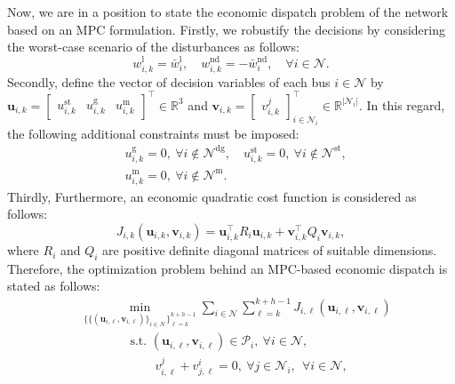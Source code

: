 Now, we are in a position to state the economic dispatch problem of the network based on an MPC formulation. Firstly, we robustify the decisions by considering the worst-case scenario of the disturbances as follows: 
\begin{equation}
w_{i,k}^{\mathrm{l}} = \bar{w}_{i}^{\mathrm{l}}, \quad 
w_{i,k}^{\mathrm{nd}} = -\bar{w}_{i}^{\mathrm{nd}}, \quad \forall i \in \mathcal{N}. \label{eq:ws_d}
\end{equation}
Secondly, define the vector of decision variables of each bus $i\in \mathcal{N}$ by $\bm{u}_{i,k} = \begin{bmatrix}
u^{\mathrm{st}}_{i,k} & u^{\mathrm{g}}_{i,k}  & u^{\mathrm{m}}_{i,k}
\end{bmatrix}^{\top} \in \mathbb{R}^{3}$ and $\bm{v}_{i,k} = \begin{bmatrix}
v_{i,k}^{j}
\end{bmatrix}_{i\in \mathcal{N}_i}^{\top} \in \mathbb{R}^{|\mathcal{N}_i|}$. In this regard, the following additional constraints must be imposed:
\begin{equation}
\begin{aligned}
&u_{i,k}^{\mathrm{g}}=0, \ \forall i \notin \mathcal{N}^{\mathrm{dg}}, \quad u_{i,k}^{\mathrm{st}}=0, \ \forall i \notin \mathcal{N}^{\mathrm{st}}, \\ &u_{i,k}^{\mathrm{m}}=0, \ \forall i \notin \mathcal{N}^{\mathrm{m}}. 
\end{aligned}
\label{eq:0_const}
\end{equation}
Thirdly, 
\fi 
Furthermore, an economic quadratic cost function is considered as follows:
\begin{equation}
J_{i,k}(\bm{u}_{i,k},\bm{v}_{i,k}) = \bm{u}_{i,k}^{\top}R_i\bm{u}_{i,k}+ \bm{v}_{i,k}^{\top}Q_i\bm{v}_{i,k}, \label{eq:cost_func}
\end{equation}
where $R_i$ and $Q_i$ are positive definite diagonal matrices of suitable dimensions. Therefore, the optimization problem behind an MPC-based economic dispatch is stated as follows:
\begin{subequations}
	\begin{align}
&	\min_{\{\{(\bm{u}_{i,\ell},\bm{v}_{i,\ell})\}_{i \in \mathcal{N}}\}_{\ell=k}^{k+h-1}} \sum_{i \in \mathcal{N}} \sum_{\ell =k}^{k+h-1}  J_{i,\ell}(\bm{u}_{i,\ell},\bm{v}_{i,\ell}) \label{eq:net_cost_func}\\
& \qquad \qquad	\text{s.t. }   
	 (\bm{u}_{i,\ell},\bm{v}_{i,\ell}) \in \mathcal{P}_i, \ \forall i \in \mathcal{N}, \label{eq:net_loc_cons}\\
	&  \qquad \qquad \qquad  v_{i,\ell}^j + v_{j,\ell}^i = 0, \ \forall j\in\mathcal{N}_i, \ \ \forall i \in \mathcal{N}, \label{eq:net_coup_cons}
	\end{align}
	\label{eq:MPC_net}%
\end{subequations}
